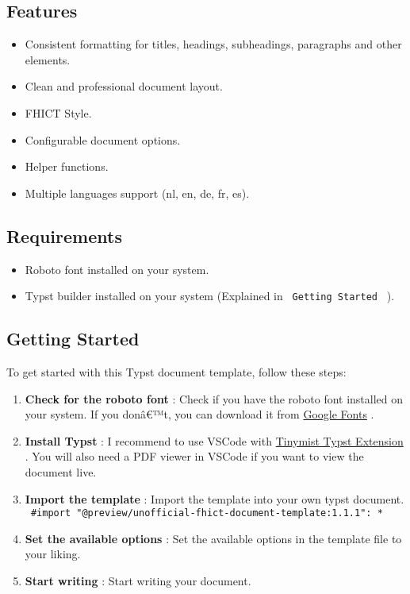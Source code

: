 \subsection{Features}\label{features}

\begin{itemize}
\tightlist
\item
  Consistent formatting for titles, headings, subheadings, paragraphs
  and other elements.
\item
  Clean and professional document layout.
\item
  FHICT Style.
\item
  Configurable document options.
\item
  Helper functions.
\item
  Multiple languages support (nl, en, de, fr, es).
\end{itemize}

\subsection{Requirements}\label{requirements}

\begin{itemize}
\tightlist
\item
  Roboto font installed on your system.
\item
  Typst builder installed on your system (Explained in
  \texttt{\ Getting\ Started\ } ).
\end{itemize}

\subsection{Getting Started}\label{getting-started}

To get started with this Typst document template, follow these steps:

\begin{enumerate}
\tightlist
\item
  \textbf{Check for the roboto font} : Check if you have the roboto font
  installed on your system. If you donâ€™t, you can download it from
  \href{https://fonts.google.com/specimen/Roboto}{Google Fonts} .
\item
  \textbf{Install Typst} : I recommend to use VSCode with
  \href{https://marketplace.visualstudio.com/items?itemName=myriad-dreamin.tinymist}{Tinymist
  Typst Extension} . You will also need a PDF viewer in VSCode if you
  want to view the document live.
\item
  \textbf{Import the template} : Import the template into your own typst
  document.
  \texttt{\ \#import\ "@preview/unofficial-fhict-document-template:1.1.1":\ *\ }
\item
  \textbf{Set the available options} : Set the available options in the
  template file to your liking.
\item
  \textbf{Start writing} : Start writing your document.
\end{enumerate}

